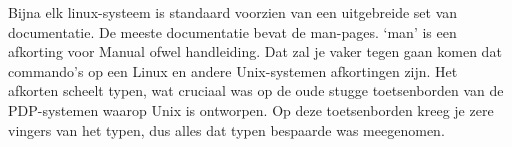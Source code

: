 Bijna elk linux-systeem is standaard voorzien van een uitgebreide set van documentatie. De
meeste documentatie bevat de man-pages. `man' is een afkorting voor Manual ofwel handleiding. Dat zal je vaker tegen
gaan komen dat commando's op een Linux en andere Unix-systemen afkortingen zijn. Het afkorten scheelt typen, wat
cruciaal was op de oude stugge toetsenborden van de PDP-systemen waarop Unix is ontworpen. Op deze toetsenborden kreeg
je zere vingers van het typen, dus alles dat typen bespaarde was meegenomen.
